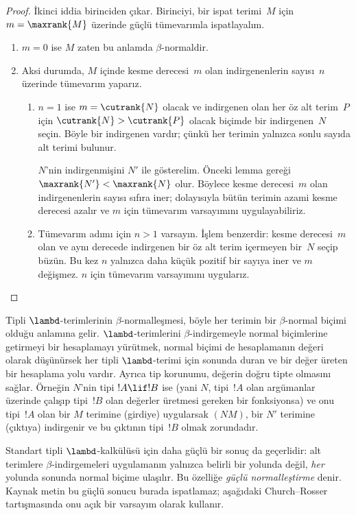 \begin{proof}
  İkinci iddia birinciden çıkar. Birinciyi, bir ispat terimi~$M$ için
  $m=\maxrank{M}$ üzerinde güçlü tümevarımla ispatlayalım.
  \begin{enumerate}
  \item $m=0$ ise $M$ zaten bu anlamda $\beta$-normaldir.
  \item Aksi durumda, $M$ içinde kesme derecesi~$m$ olan indirgenenlerin
    sayısı~$n$ üzerinde tümevarım yaparız.
    \begin{enumerate}
    \item $n=1$ ise $m = \cutrank{N}$ olacak ve indirgenen olan her öz
      alt terim~$P$ için $\cutrank{N} > \cutrank{P}$ olacak biçimde bir
      indirgenen~$N$ seçin. Böyle bir indirgenen vardır; çünkü her terimin
      yalnızca sonlu sayıda alt terimi bulunur.

      $N$'nin indirgenmişini $N'$ ile gösterelim. Önceki lemma gereği
      $\maxrank{N'} < \maxrank{N}$ olur. Böylece kesme derecesi~$m$ olan
      indirgenenlerin sayısı sıfıra iner; dolayısıyla bütün terimin azami
      kesme derecesi azalır ve $m$ için tümevarım varsayımını uygulayabiliriz.
    \item Tümevarım adımı için $n>1$ varsayın. İşlem benzerdir: kesme
      derecesi~$m$ olan ve aynı derecede indirgenen bir öz alt terim
      içermeyen bir~$N$ seçip büzün. Bu kez $n$ yalnızca daha küçük pozitif
      bir sayıya iner ve $m$ değişmez. $n$ için tümevarım varsayımını
      uygularız.
    \end{enumerate}
  \end{enumerate}
\end{proof}

Tipli $\lambd$-terimlerinin $\beta$-normalleşmesi, böyle her terimin bir
$\beta$-normal biçimi olduğu anlamına gelir. $\lambd$-terimlerini $\beta$-indirgemeyle
normal biçimlerine getirmeyi bir hesaplamayı yürütmek, normal biçimi de
hesaplamanın değeri olarak düşünürsek her tipli $\lambd$-terimi için sonunda
duran ve bir değer üreten bir hesaplama yolu vardır. Ayrıca tip korunumu, değerin
doğru tipte olmasını sağlar. Örneğin $N$'nin tipi $!A \lif !B$ ise (yani
$N$, tipi~$!A$ olan argümanlar üzerinde çalışıp tipi~$!B$ olan değerler
üretmesi gereken bir fonksiyonsa) ve onu tipi~$!A$ olan bir $M$ terimine
(girdiye) uygularsak $(NM)$, bir $N'$ terimine (çıktıya) indirgenir ve bu
çıktının tipi~$!B$ olmak zorundadır.

Standart tipli $\lambd$-kalkülüsü için daha güçlü bir sonuç da geçerlidir:
alt terimlere $\beta$-indirgemeleri uygulamanın yalnızca belirli bir yolunda
değil, \emph{her} yolunda sonunda normal biçime ulaşılır. Bu özelliğe
\emph{güçlü normalleştirme} denir. Kaynak metin bu güçlü sonucu burada
ispatlamaz; aşağıdaki Church--Rosser tartışmasında onu açık bir varsayım olarak
kullanır.

